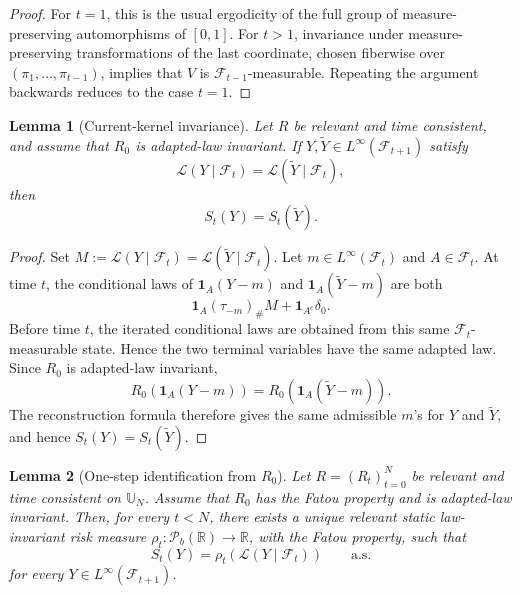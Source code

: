 \documentclass[a4paper]{amsart}
\newtheorem{lemma}[lemma]{Lemma}
\theoremstyle{definition}
\newcommand{\R}{\mathbb{R}}
\newcommand{\F}{\mathcal{F}}
\newcommand{\law}{\mathcal{L}}
\newcommand{\Pc}{\mathcal P}
\begin{document}
\begin{proof}
For \(t=1\), this is the usual ergodicity of the full group of
measure-preserving automorphisms of \([0,1]\). For \(t>1\), invariance under
measure-preserving transformations of the last coordinate, chosen fiberwise
over \((\pi_1,\dots,\pi_{t-1})\), implies that \(V\) is
\(\F_{t-1}\)-measurable. Repeating the argument backwards reduces to the case
\(t=1\).
\end{proof}

\begin{lemma}[Current-kernel invariance]
\label{lem:current-kernel-invariance}
Let \(R\) be relevant and time consistent, and assume that \(R_0\) is
adapted-law invariant. If \(Y,\widetilde Y\in L^\infty(\F_{t+1})\) satisfy
\[
\law(Y\mid\F_t)=\law(\widetilde Y\mid\F_t),
\]
then
\[
S_t(Y)=S_t(\widetilde Y).
\]
\end{lemma}

\begin{proof}
Set \(M:=\law(Y\mid\F_t)=\law(\widetilde Y\mid\F_t)\). Let
\(m\in L^\infty(\F_t)\) and \(A\in\F_t\). At time \(t\), the conditional laws
of \(\mathbf 1_A(Y-m)\) and \(\mathbf 1_A(\widetilde Y-m)\) are both
\[
\mathbf 1_A(\tau_{-m})_\#M+\mathbf 1_{A^c}\delta_0.
\]
Before time \(t\), the iterated conditional laws are obtained from this same
\(\F_t\)-measurable state. Hence the two terminal variables have the same
adapted law. Since \(R_0\) is adapted-law invariant,
\[
R_0(\mathbf 1_A(Y-m))
=
R_0(\mathbf 1_A(\widetilde Y-m)).
\]
The reconstruction formula therefore gives the same admissible \(m\)'s for
\(Y\) and \(\widetilde Y\), and hence \(S_t(Y)=S_t(\widetilde Y)\).
\end{proof}

\begin{lemma}[One-step identification from \(R_0\)]
\label{lem:one-step-from-R0}
Let \(R=(R_t)_{t=0}^N\) be relevant and time consistent on \(\mathbb U_N\).
Assume that \(R_0\) has the Fatou property and is adapted-law invariant. Then,
for every \(t<N\), there exists a unique relevant static law-invariant risk
measure \(\rho_t:\Pc_b(\R)\to\R\), with the Fatou property, such that
\[
S_t(Y)=\rho_t(\law(Y\mid\F_t))
\qquad\text{a.s.}
\]
for every \(Y\in L^\infty(\F_{t+1})\).
\end{lemma}
\end{document}

